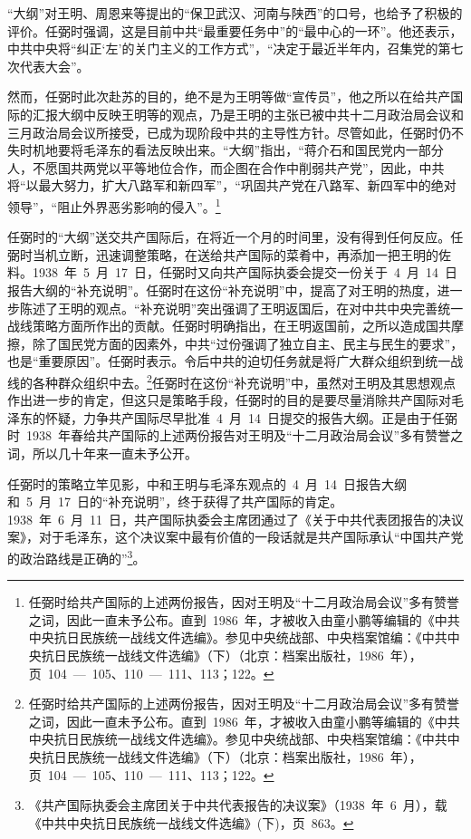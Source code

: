 “大纲”对王明、周恩来等提出的“保卫武汉、河南与陕西”的口号，也给予了积极的评价。任弼时强调，这是目前中共“最重要任务中”的“最中心的一环”。他还表示，中共中央将“纠正‘左’的关门主义的工作方式”，“决定于最近半年内，召集党的第七次代表大会”。

然而，任弼时此次赴苏的目的，绝不是为王明等做“宣传员”，他之所以在给共产国际的汇报大纲中反映王明等的观点，乃是王明的主张已被中共十二月政治局会议和三月政治局会议所接受，已成为现阶段中共的主导性方针。尽管如此，任弼时仍不失时机地要将毛泽东的看法反映出来。“大纲”指出，“蒋介石和国民党内一部分人，不愿国共两党以平等地位合作，而企图在合作中削弱共产党”，因此，中共将“以最大努力，扩大八路军和新四军”，“巩固共产党在八路军、新四军中的绝对领导”，“阻止外界恶劣影响的侵入”。\footnote{任弼时给共产国际的上述两份报告，因对王明及“十二月政治局会议”多有赞誉之词，因此一直未予公布。直到~1986~年，才被收入由童小鹏等编辑的《中共中央抗日民族统一战线文件选编》。参见中央统战部、中央档案馆编：《中共中央抗日民族统一战线文件选编》（下）（北京：档案出版社，1986~年），页~104~—~105、110~—~111、113；122。}

任弼时的“大纲”送交共产国际后，在将近一个月的时间里，没有得到任何反应。任弼时当机立断，迅速调整策略，在送给共产国际的菜肴中，再添加一把王明的佐料。1938~年~5~月~17~日，任弼时又向共产国际执委会提交一份关于~4~月~14~日报告大纲的“补充说明”。任弼时在这份“补充说明”中，提高了对王明的热度，进一步陈述了王明的观点。“补充说明”突出强调了王明返国后，在对中共中央完善统一战线策略方面所作出的贡献。任弼时明确指出，在王明返国前，之所以造成国共摩擦，除了国民党方面的因素外，中共“过份强调了独立自主、民主与民生的要求”，也是“重要原因”。任弼时表示。令后中共的迫切任务就是将广大群众组织到统一战线的各种群众组织中去。\footnote{任弼时给共产国际的上述两份报告，因对王明及“十二月政治局会议”多有赞誉之词，因此一直未予公布。直到~1986~年，才被收入由童小鹏等编辑的《中共中央抗日民族统一战线文件选编》。参见中央统战部、中央档案馆编：《中共中央抗日民族统一战线文件选编》（下）（北京：档案出版社，1986~年），页~104~—~105、110~—~111、113；122。}任弼时在这份“补充说明”中，虽然对王明及其思想观点作出进一步的肯定，但这只是策略手段，任弼时的目的是要尽量消除共产国际对毛泽东的怀疑，力争共产国际尽早批准~4~月~14~日提交的报告大纲。正是由于任弼时~1938~年春给共产国际的上述两份报告对王明及“十二月政治局会议”多有赞誉之词，所以几十年来一直未予公开。

任弼时的策略立竿见影，中和王明与毛泽东观点的~4~月~14~日报告大纲和~5~月~17~日的“补充说明”，终于获得了共产国际的肯定。1938~年~6~月~11~日，共产国际执委会主席团通过了《关于中共代表团报告的决议案》，对于毛泽东，这个决议案中最有价值的一段话就是共产国际承认“中国共产党的政治路线是正确的”\footnote{《共产国际执委会主席团关于中共代表报告的决议案》（1938~年~6~月），载《中共中央抗日民族统一战线文件选编》(下)，页~863。}。

